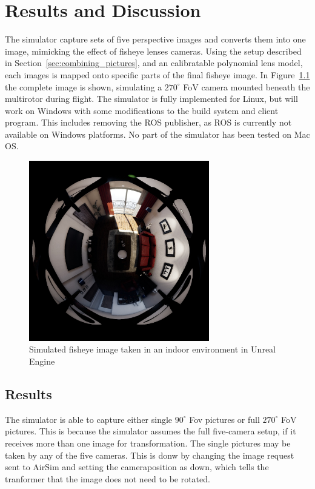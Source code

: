 
\chapter{Results and Discussion}

The simulator capture sets of five perspective images and converts them into one image, mimicking the effect of fisheye lenses cameras. Using the setup described in Section~\ref{sec:combining_pictures}, and an calibratable polynomial lens model, each images is mapped onto specific parts of the final fisheye image. In Figure~\ref{fig:res_show_fisheye} the complete image is shown, simulating a $270^\circ$ FoV camera mounted beneath the multirotor during flight. The simulator is fully implemented for Linux, but will work on Windows with some modifications to the build system and client program. This includes removing the ROS publisher, as ROS is currently not available on Windows platforms. No part of the simulator has been tested on Mac OS. 

\begin{figure}[!htb]
    \centering
    \includegraphics[width=0.7\textwidth]{rapport/fig/Results/1024to1024.jpeg}
    \caption{Simulated fisheye image taken in an indoor environment in Unreal Engine}
    \label{fig:res_show_fisheye}
\end{figure}

\section{Results}

The simulator is able to capture either single $90^\circ$ Fov pictures or full $270^\circ$ FoV pictures. This is because the simulator assumes the full five-camera setup, if it receives more than one image for transformation. The single pictures may be taken by any of the five cameras. This is donw by changing the image request sent to AirSim and setting the cameraposition as down, which tells the tranformer that the image does not need to be rotated.

